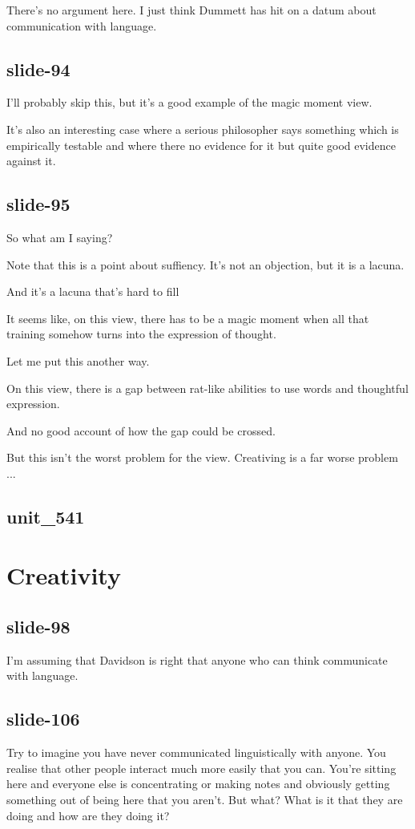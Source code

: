 \documentclass[12pt,\papersize]{extarticle}
\begin{document}
There's no argument here.  I just think Dummett has hit on a datum about communication with language.
 
\subsection{slide-94}
I'll probably skip this, but it's a good example of the magic moment view.
 
It's also an interesting case where a serious philosopher says something which is empirically testable and where there no evidence for it but quite good evidence against it.
 
\subsection{slide-95}
So what am I saying?
 
Note that this is a point about suffiency.  It's not an objection, but it is a lacuna.
 
And it's a lacuna that's hard to fill
 
It seems like, on this view, there has to be a magic moment when all that training somehow turns into the expression of thought.
 
Let me put this another way.
 
On this view, there is a gap between rat-like abilities to use words and thoughtful expression.
 
And no good account of how the gap could be crossed.
 
But this isn't the worst problem for the view.  Creativing is a far worse problem ...
 
\subsection{unit\_541}
 
 
\section{Creativity}
 
\subsection{slide-98}
I'm assuming that Davidson is right that anyone who can think communicate with language.
 
\subsection{slide-106}
Try to imagine you have never communicated linguistically with anyone.  You realise that other people interact much more easily that you can.  You're sitting here and everyone else is concentrating or making notes and obviously getting something out of being here that you aren't.  But what?  What is it that they are doing and how are they doing it?
 
\end{document}
